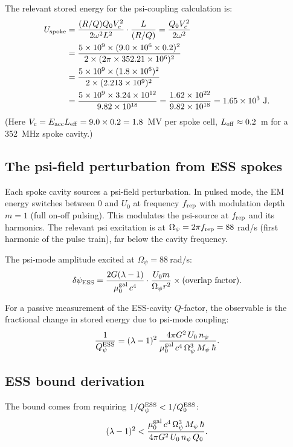 \documentclass[11pt,twocolumn]{article}
\newcommand{\dpsi}{\delta\psi}
\newcommand{\lam}{\lambda}
\newcommand{\Opsi}{\Omega_\psi}
\newcommand{\Mpsi}{M_\psi}
\newcommand{\ee}[1]{\times 10^{#1}}
\begin{document}
The relevant stored energy for the psi-coupling calculation is:
\begin{align}
U_{\rm spoke} &= \frac{(R/Q)Q_0 V_c^2}{2\omega^2 L^2}
\cdot\frac{L}{(R/Q)}
= \frac{Q_0 V_c^2}{2\omega^2}
\nonumber\\
&= \frac{5\ee{9}\times(9.0\ee{6}\times0.2)^2}
{2\times(2\pi\times352.21\ee{6})^2}
\nonumber\\
&= \frac{5\ee{9}\times(1.8\ee{6})^2}
{2\times(2.213\ee{9})^2}
\nonumber\\
&= \frac{5\ee{9}\times3.24\ee{12}}
{9.82\ee{18}}
= \frac{1.62\ee{22}}{9.82\ee{18}}
= 1.65\ee{3}~\text{J}.
\label{eq:ess_U0}
\end{align}
(Here $V_c = E_{\rm acc} L_{\rm eff} = 9.0\times0.2 = 1.8$~MV
per spoke cell, $L_{\rm eff} \approx 0.2$~m for a 352~MHz spoke cavity.)

\subsection{The psi-field perturbation from ESS spokes}

Each spoke cavity sources a psi-field perturbation. In pulsed mode,
the EM energy switches between $0$ and $U_0$ at frequency $f_{\rm rep}$
with modulation depth $m = 1$ (full on-off pulsing). This modulates
the psi-source at $f_{\rm rep}$ and its harmonics. The relevant psi
excitation is at $\Opsi = 2\pi f_{\rm rep} = 88~$rad/s (first harmonic
of the pulse train), far below the cavity frequency.

The psi-mode amplitude excited at $\Opsi = 88~$rad/s:
\begin{equation}
\dpsi_{\rm ESS} = \frac{2G(\lam-1)}{\mu_0^{\rm gal}\,c^4}\cdot
\frac{U_0 m}{\Opsi r^2}
\times\text{(overlap factor)}.
\label{eq:ess_dpsi}
\end{equation}

For a passive measurement of the ESS-cavity $Q$-factor, the observable
is the fractional change in stored energy due to psi-mode coupling:
\begin{equation}
\frac{1}{Q_\psi^{\rm ESS}} = (\lam-1)^2\,
\frac{4\pi G^2\,U_0\,n_\psi}{\mu_0^{\rm gal}\,c^4\,\Opsi^3\,\Mpsi\,\hbar}.
\label{eq:Q_psi_ESS}
\end{equation}

\subsection{ESS bound derivation}

The bound comes from requiring $1/Q_\psi^{\rm ESS} < 1/Q_0^{\rm ESS}$:
\begin{equation}
(\lam-1)^2 < \frac{\mu_0^{\rm gal}\,c^4\,\Opsi^3\,\Mpsi\,\hbar}
{4\pi G^2\,U_0\,n_\psi\,Q_0}.
\label{eq:ess_bound_general}
\end{equation}
\end{document}
